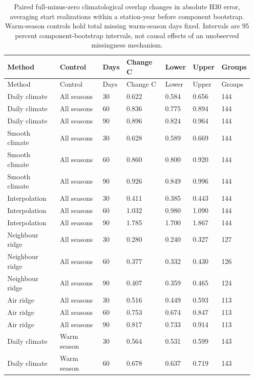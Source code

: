 {\tabletext
\setlength{\tabcolsep}{3pt}
\begin{longtable}{p{}p{}p{}p{}p{}p{}p{}}
\caption{Paired full-minus-zero climatological overlap changes in absolute H30 error, averaging start realizations within a station-year before component bootstrap. Warm-season controls hold total missing warm-season days fixed. Intervals are 95 percent component-bootstrap intervals, not causal effects of an unobserved missingness mechanism.}\label{tab:r3si-position}\\
\toprule
Method & Control & Days & Change C & Lower & Upper & Groups \\
\midrule
\endfirsthead
\toprule
Method & Control & Days & Change C & Lower & Upper & Groups \\
\midrule
\endhead
Daily climate & All seasons & 30 & 0.622 & 0.584 & 0.656 & 144 \\
Daily climate & All seasons & 60 & 0.836 & 0.775 & 0.894 & 144 \\
Daily climate & All seasons & 90 & 0.896 & 0.824 & 0.964 & 144 \\
Smooth climate & All seasons & 30 & 0.628 & 0.589 & 0.669 & 144 \\
Smooth climate & All seasons & 60 & 0.860 & 0.800 & 0.920 & 144 \\
Smooth climate & All seasons & 90 & 0.926 & 0.849 & 0.996 & 144 \\
Interpolation & All seasons & 30 & 0.411 & 0.385 & 0.443 & 144 \\
Interpolation & All seasons & 60 & 1.032 & 0.980 & 1.090 & 144 \\
Interpolation & All seasons & 90 & 1.785 & 1.700 & 1.867 & 144 \\
Neighbour ridge & All seasons & 30 & 0.280 & 0.240 & 0.327 & 127 \\
Neighbour ridge & All seasons & 60 & 0.377 & 0.332 & 0.430 & 126 \\
Neighbour ridge & All seasons & 90 & 0.407 & 0.359 & 0.465 & 124 \\
Air ridge & All seasons & 30 & 0.516 & 0.449 & 0.593 & 113 \\
Air ridge & All seasons & 60 & 0.753 & 0.674 & 0.847 & 113 \\
Air ridge & All seasons & 90 & 0.817 & 0.733 & 0.914 & 113 \\
Daily climate & Warm season & 30 & 0.564 & 0.531 & 0.599 & 143 \\
Daily climate & Warm season & 60 & 0.678 & 0.637 & 0.719 & 143 \\

\end{longtable}}
